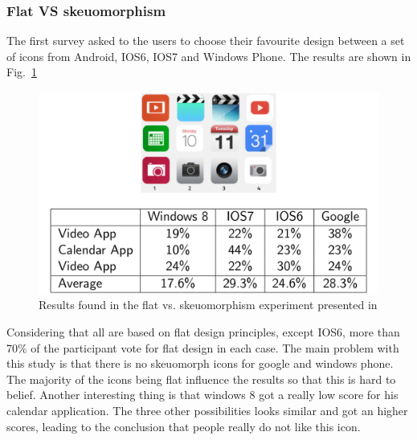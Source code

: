 \documentclass[a4paper,11pt] {article}
\theoremstyle{definition}
\begin{document}
    \subsubsection{Flat VS skeuomorphism}

    The first survey \cite{flatVSskeuomorphisme} asked to the users to choose their favourite design between a set of icons from Android, IOS6, IOS7 and Windows Phone. The results are shown in Fig.~\ref{fig:flat-vs-skeu-result}\\

    \begin{figure}[h]
    \centering
    \includegraphics[scale=0.3]{fig-report/flatVSskeuomorphism.png}
    \caption{Results found in the flat vs. skeuomorphism experiment presented in \cite{flatVSskeuomorphisme}}
    \label{fig:flat-vs-skeu-result}
    \end{figure}



    Considering that all are based on flat design principles, except IOS6, more than 70\% of the participant vote for flat design in each case. 
    The main problem with this study is that there is no skeuomorph icons for google and windows phone. The majority of the icons being flat influence the results so that this is hard to belief. Another interesting thing is that windows 8 got a really low score for his calendar application. The three other possibilities looks similar and got an higher scores, leading to the conclusion that people really do not like this icon.
\end{document}
